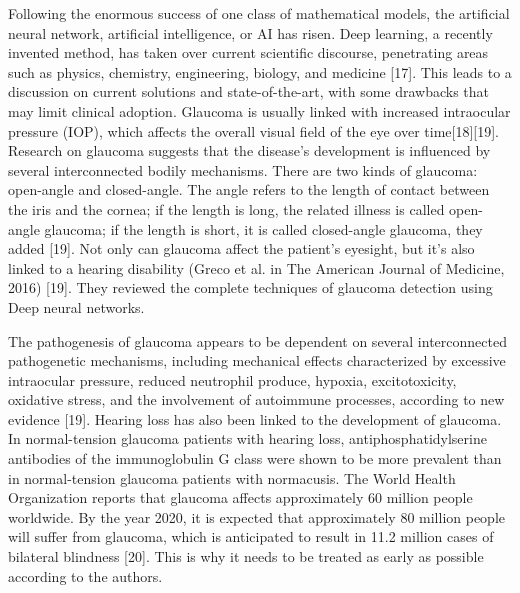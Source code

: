 \vspace{5mm}
Following the enormous success of one class of mathematical models, the artificial neural network, artificial intelligence, or AI has risen. Deep learning, a recently invented method, has taken over current scientific discourse, penetrating areas such as physics, chemistry, engineering, biology, and medicine [17]. This leads to a discussion on current solutions and state-of-the-art, with some drawbacks that may limit clinical adoption. Glaucoma is usually linked with increased intraocular pressure (IOP), which affects the overall visual field of the eye over time[18][19]. Research on glaucoma suggests that the disease's development is influenced by several interconnected bodily mechanisms. There are two kinds of glaucoma: open-angle and closed-angle. The angle refers to the length of contact between the iris and the cornea; if the length is long, the related illness is called open-angle glaucoma; if the length is short, it is called closed-angle glaucoma, they added [19]. Not only can glaucoma affect the patient's eyesight, but it's also linked to a hearing disability (Greco et al. in The American Journal of Medicine, 2016) [19]. They reviewed the complete techniques of glaucoma detection using  Deep neural networks.

\vspace{5mm}
The pathogenesis of glaucoma appears to be dependent on several interconnected pathogenetic mechanisms, including mechanical effects characterized by excessive intraocular pressure, reduced neutrophil produce, hypoxia, excitotoxicity, oxidative stress, and the involvement of autoimmune processes, according to new evidence [19]. Hearing loss has also been linked to the development of glaucoma. In normal-tension glaucoma patients with hearing loss, antiphosphatidylserine antibodies of the immunoglobulin G class were shown to be more prevalent than in normal-tension glaucoma patients with normacusis. The World Health Organization reports that glaucoma affects approximately 60 million people worldwide. By the year 2020, it is expected that approximately 80 million people will suffer from glaucoma, which is anticipated to result in 11.2 million cases of bilateral blindness [20]. This is why it needs to be treated as early as possible according to the authors.

